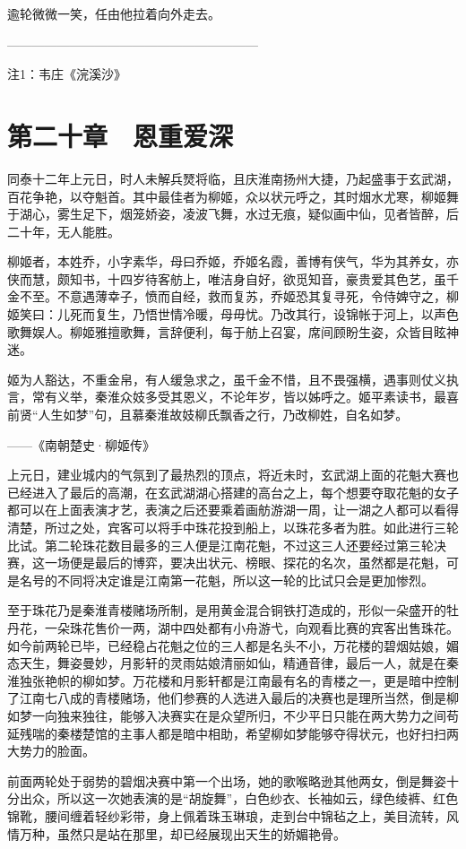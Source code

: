 逾轮微微一笑，任由他拉着向外走去。

————————————————————

注1：韦庄《浣溪沙》

\chapter{第二十章　恩重爱深}

同泰十二年上元日，时人未解兵燹将临，且庆淮南扬州大捷，乃起盛事于玄武湖，百花争艳，以夺魁首。其中最佳者为柳姬，众以状元呼之，其时烟水尤寒，柳姬舞于湖心，雾生足下，烟笼娇姿，凌波飞舞，水过无痕，疑似画中仙，见者皆醉，后二十年，无人能胜。

柳姬者，本姓乔，小字素华，母曰乔姬，乔姬名霞，善博有侠气，华为其养女，亦侠而慧，颇知书，十四岁待客舫上，唯洁身自好，欲觅知音，豪贵爱其色艺，虽千金不至。不意遇薄幸子，愤而自经，救而复苏，乔姬恐其复寻死，令侍婢守之，柳姬笑曰：儿死而复生，乃悟世情冷暖，母毋忧。乃改其行，设锦帐于河上，以声色歌舞娱人。柳姬雅擅歌舞，言辞便利，每于舫上召宴，席间顾盼生姿，众皆目眩神迷。

姬为人豁达，不重金帛，有人缓急求之，虽千金不惜，且不畏强横，遇事则仗义执言，常有义举，秦淮众妓多受其恩义，不论年岁，皆以姊呼之。姬平素读书，最喜前贤“人生如梦”句，且慕秦淮故妓柳氏飘香之行，乃改柳姓，自名如梦。

——《南朝楚史·柳姬传》

上元日，建业城内的气氛到了最热烈的顶点，将近未时，玄武湖上面的花魁大赛也已经进入了最后的高潮，在玄武湖湖心搭建的高台之上，每个想要夺取花魁的女子都可以在上面表演才艺，表演之后还要乘着画舫游湖一周，让一湖之人都可以看得清楚，所过之处，宾客可以将手中珠花投到船上，以珠花多者为胜。如此进行三轮比试。第二轮珠花数目最多的三人便是江南花魁，不过这三人还要经过第三轮决赛，这一场便是最后的博弈，要决出状元、榜眼、探花的名次，虽然都是花魁，可是名号的不同将决定谁是江南第一花魁，所以这一轮的比试只会是更加惨烈。

至于珠花乃是秦淮青楼赌场所制，是用黄金混合铜铁打造成的，形似一朵盛开的牡丹花，一朵珠花售价一两，湖中四处都有小舟游弋，向观看比赛的宾客出售珠花。如今前两轮已毕，已经稳占花魁之位的三人都是名头不小，万花楼的碧烟姑娘，媚态天生，舞姿曼妙，月影轩的灵雨姑娘清丽如仙，精通音律，最后一人，就是在秦淮独张艳帜的柳如梦。万花楼和月影轩都是江南最有名的青楼之一，更是暗中控制了江南七八成的青楼赌场，他们参赛的人选进入最后的决赛也是理所当然，倒是柳如梦一向独来独往，能够入决赛实在是众望所归，不少平日只能在两大势力之间苟延残喘的秦楼楚馆的主事人都是暗中相助，希望柳如梦能够夺得状元，也好扫扫两大势力的脸面。

前面两轮处于弱势的碧烟决赛中第一个出场，她的歌喉略逊其他两女，倒是舞姿十分出众，所以这一次她表演的是“胡旋舞”，白色纱衣、长袖如云，绿色绫裤、红色锦靴，腰间缠着轻纱彩带，身上佩着珠玉琳琅，走到台中锦毡之上，美目流转，风情万种，虽然只是站在那里，却已经展现出天生的娇媚艳骨。


